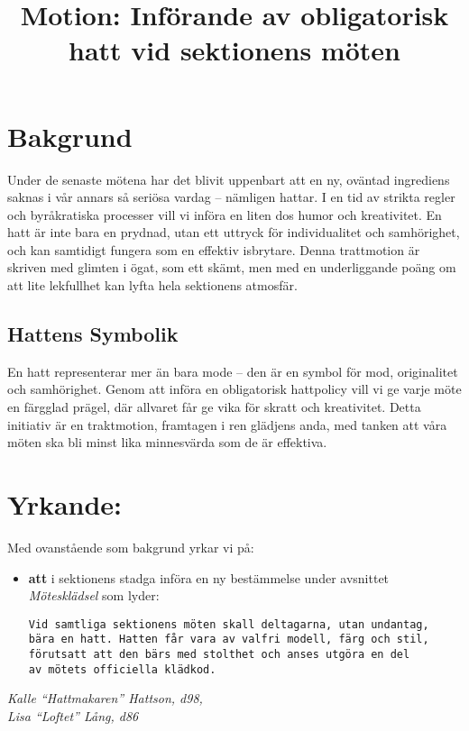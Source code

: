 \documentclass[a4paper]{dtekmotion}
\title{Motion: Införande av obligatorisk hatt vid sektionens möten}
\begin{document}
\maketitle

\section{Bakgrund}
Under de senaste mötena har det blivit uppenbart att en ny, oväntad ingrediens saknas i vår annars så seriösa vardag – nämligen hattar. I en tid av strikta regler och byråkratiska processer vill vi införa en liten dos humor och kreativitet. En hatt är inte bara en prydnad, utan ett uttryck för individualitet och samhörighet, och kan samtidigt fungera som en effektiv isbrytare. Denna trattmotion är skriven med glimten i ögat, som ett skämt, men med en underliggande poäng om att lite lekfullhet kan lyfta hela sektionens atmosfär.

\subsection*{Hattens Symbolik}
En hatt representerar mer än bara mode – den är en symbol för mod, originalitet och samhörighet. Genom att införa en obligatorisk hattpolicy vill vi ge varje möte en färgglad prägel, där allvaret får ge vika för skratt och kreativitet. Detta initiativ är en traktmotion, framtagen i ren glädjens anda, med tanken att våra möten ska bli minst lika minnesvärda som de är effektiva.

\section{Yrkande:}
Med ovanstående som bakgrund yrkar vi på: 

\begin{itemize}

\item \textbf{att} i sektionens stadga införa en ny bestämmelse under avsnittet \textit{Mötesklädsel} som lyder:
\begin{verbatim}
Vid samtliga sektionens möten skall deltagarna, utan undantag,
bära en hatt. Hatten får vara av valfri modell, färg och stil,
förutsatt att den bärs med stolthet och anses utgöra en del
av mötets officiella klädkod.
\end{verbatim}

\end{itemize}

\textit{Kalle \enquote{Hattmakaren} Hattson, d98,\\}
\textit{Lisa \enquote{Loftet} Lång, d86}
\end{document}
